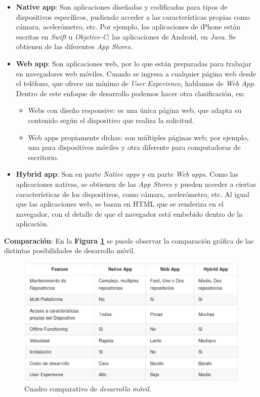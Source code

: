 \begin{itemize}
\item \textbf{Native app}:
Son aplicaciones diseñadas y codificadas para tipos de dispositivos específicos, pudiendo acceder a las características propias como cámara, acelerómetro, etc.
Por ejemplo, las aplicaciones de iPhone están escritas en \textit{Swift} u \textit{Objetive-C}; las aplicaciones de Android, en \textit{Java}.
Se obtienen de las diferentes \textit{App Stores}.

\item \textbf{Web app}:
Son aplicaciones web, por lo que están preparadas para trabajar en navegadores web móviles.
Cuando se ingresa a cualquier página web desde el teléfono, que ofrece un mínimo de \textit{User Experience}, hablamos de \textit{Web App}.
Dentro de este enfoque de desarrollo podemos hacer otra clasificación, en: 
\begin{itemize}
    \item Webs con diseño responsive: es una única página web, que adapta su contenido según el dispositivo que realiza la solicitud.
    \item Web apps propiamente dichas: son múltiples páginas web; por ejemplo, una para dispositivos móviles y otra diferente para computadoras de escritorio.
\end{itemize}

\item \textbf{Hybrid app}:
Son en parte \textit{Native apps} y en parte \textit{Web apps}.
Como las aplicaciones nativas, se obtienen de las \textit{App Stores} y pueden acceder a ciertas características de los dispositivos, como cámara, acelerómetro, etc.
Al igual que las aplicaciones web, se basan en HTML que se renderiza en el navegador, con el detalle de que el navegador está embebido dentro de la aplicación.

\end{itemize}


\textbf{Comparación}:
En la \textbf{Figura \ref{appMobile}} se puede observar la comparación gráfica de las distintas posibilidades de desarrollo móvil.

\begin{figure}
  \centering
  \includegraphics[width=1\textwidth]{img/tp2_definicion/appMobile}
  \caption{Cuadro comparativo de \textit{desarrollo móvil}.}
  \label{appMobile}
\end{figure}

